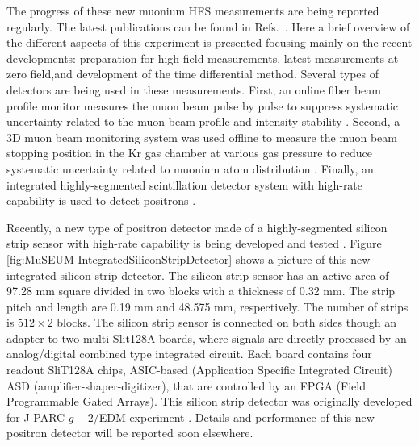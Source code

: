 The progress of these new muonium HFS measurements are being
reported regularly.  The latest publications can be found
in Refs.~\cite{Strasser2016, Ueno2017,
Shimomura-etal-doi:10.1142/9789813148505_0008,
T.Tanaka-etal-PSAS2018}.  Here a brief overview of the different
aspects of this experiment is presented focusing mainly on
the recent developments: preparation for high-field measurements,
latest measurements at zero field,and development of the time
differential method.  Several types of detectors are being
used in these measurements.  First, an online fiber beam
profile monitor measures the muon beam pulse by pulse to
suppress systematic uncertainty related to the muon beam
profile and intensity stability \cite{Kanda-PhotoDet2015}.
Second, a 3D muon
beam monitoring system was used offline to measure the muon
beam stopping position in the Kr gas chamber at various gas
pressure to reduce systematic uncertainty related to muonium
atom distribution \cite{Ueno2017, Y.Ueno-etal-LEAP2016}.
Finally, an integrated highly-segmented
scintillation detector system with high-rate capability is
used to detect positrons \cite{Kanda-PhotoDet2015,
Kanda-etal-JPARCSympo2015}.


Recently, a new type of positron detector made of a highly-segmented
silicon strip sensor with high-rate capability is being developed
and tested \cite{Nishimura-phdthesis}.  
Figure \ref{fig:MuSEUM-IntegratedSiliconStripDetector}
shows a picture of this new integrated silicon strip detector.
The silicon strip sensor has an active area of 97.28 mm square
divided in two blocks with a thickness of 0.32 mm.  The strip
pitch and length are 0.19 mm and 48.575 mm, respectively.
The number of strips is $512 \times 2$ blocks.  The silicon
strip sensor is connected on both sides though an adapter
to two multi-Slit128A boards, where signals are directly
processed by an analog/digital combined type integrated circuit.
Each board contains four readout SliT128A chips, ASIC-based
(Application Specific Integrated Circuit) ASD
(amplifier-shaper-digitizer), that are controlled by an FPGA
(Field Programmable Gated Arrays).  This silicon strip detector
was originally developed for J-PARC $g-2$/EDM
experiment \cite{Otani-JPARCSympo-2015}.
Details and performance of this new positron detector will be
reported soon elsewhere.
   

